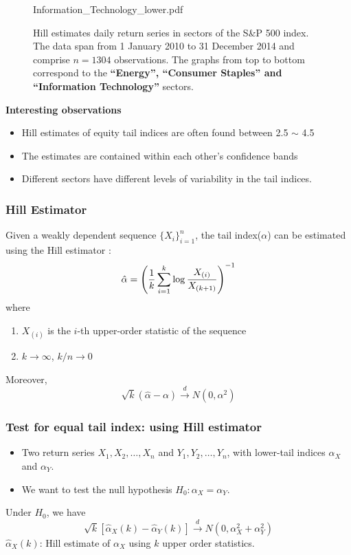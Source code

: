 \documentclass{beamer}
\begin{document}
\begin{frame}
\begin{minipage}[t]{0.5\linewidth}
\begin{figure}[htb!]
\begin{minipage}{1.0\linewidth}
                        {Information_Technology_lower.pdf}
      \end{minipage}
      \caption{\tiny Hill estimates daily return series in
        sectors of the S\&P 500 index. The data span  from 1 January
        2010 to 31 December 2014 and comprise $n=1304$ observations.
        The graphs from top to bottom correspond to the {\bf ``Energy'',
        ``Consumer Staples'' and ``Information Technology''} sectors.
      }\label{fig:1}
    \end{figure}
  \end{minipage}\hfill
  \begin{minipage}[t]{0.5\linewidth}
    \textcolor[HTML]{990033}{\bf Interesting observations}
    \begin{itemize}
      \item Hill estimates of equity tail indices are often found
        between 2.5 $\sim$ 4.5
      \item The estimates are contained within each other's confidence bands
      \item Different sectors have different levels of variability in
        the tail indices.
    \end{itemize}
  \end{minipage}
\end{frame}

\begin{frame}
  \frametitle{Hill Estimator}
  Given a weakly dependent sequence $\{X_{i}\}_{i=1}^n$, the tail
  index($\alpha$) can be estimated using the Hill estimator
  \cite{embrechts:klueppelberg:mikosch:1997}:
  \[
  \hat \alpha = \left(
    {1 \over k} \sum_{i=1}^k \log{X_{(i)} \over X_{(k+1)}}
  \right)^{-1}
  \]
  where
  \begin{enumerate}
  \item $X_{(i)}$ is the $i$-th upper-order statistic of the sequence
  \item $k \to \infty$, $k/n \to 0$
  \end{enumerate}
  Moreover,
  \[
  \sqrt k (\hat \alpha - \alpha) \overset{d}{\to} N(0, \alpha^2)
  \]
\end{frame}

\begin{frame}
  \frametitle{Test for equal tail index: using Hill estimator}
  \begin{itemize}
    \item   Two return series $X_1, X_2, \dots, X_n$ and
      $Y_1, Y_2, \dots, Y_n$, with lower-tail indices
      $\alpha_X$ and $\alpha_Y$.
    \item We want to test the null hypothesis $H_0: \alpha_X = \alpha_Y$.
  \end{itemize}
  Under $H_0$, we have
  \[
  \sqrt k [\hat \alpha_X(k) - \hat \alpha_Y(k)] \overset{d}{\to}
  N(0, \alpha_X^2 + \alpha_Y^2)
  \]
  $\hat \alpha_X(k)$: Hill estimate of $\alpha_X$ using $k$ upper
  order statistics.
\end{frame}
\end{document}
